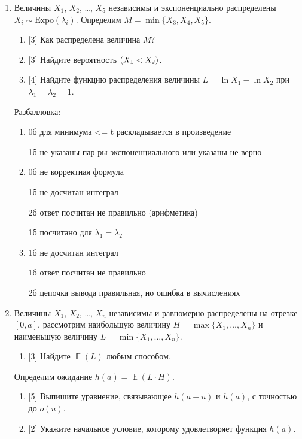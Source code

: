 \documentclass[12pt]{article}
\let\P\relax
\DeclareMathOperator{\P}{\mathbb{P}}
\DeclareMathOperator{\E}{\mathbb{E}}
\newcommand{\dExpo}{\mathrm{Expo}}
\begin{document}
\begin{enumerate}
    

    \item Величины $X_1$, $X_2$, \dots, $X_5$ независимы и экспоненциально распределены $X_i \sim \dExpo(\lambda_i)$.
    Определим  $M = \min\{X_3, X_4, X_5\}$.
    \begin{enumerate}
        \item {[3]} Как распределена величина $M$?
        \item {[3]} Найдите вероятность $\P(X_1 < X_2)$.
        \item {[4]} Найдите функцию распределения величины $L = \ln X_1 - \ln X_2$ при $\lambda_1 = \lambda_2 = 1$.
    \end{enumerate}


    Разбалловка:

    \begin{enumerate}
        \item 0б для минимума <= t раскладывается в произведение
        
        1б не указаны пар-ры экспоненциального или указаны не верно
        \item  0б не корректная формула
        
        1б не досчитан интеграл
        
        2б ответ посчитан не правильно (арифметика)
        
        1б посчитано для $\lambda_1 = \lambda_2$
        
        \item  1б не досчитан интеграл
        
        1б ответ посчитан не правильно
        
        2б цепочка вывода правильная, но ошибка в вычислениях
    \end{enumerate}


    \item Величины $X_1$, $X_2$, \dots, $X_n$ независимы и равномерно распределены на отрезке $[0, a]$,
    рассмотрим наибольшую величину $H = \max\{X_1, \dots, X_n\}$ и наименьшую величину $L = \min\{X_1, \dots, X_n\}$.
    \begin{enumerate}
        \item {[3]} Найдите $\E(L)$ любым способом. 
    \end{enumerate}
    Определим ожидание $h(a) = \E(L \cdot H)$.
    \begin{enumerate}[resume]
        \item {[5]} Выпишите уравнение, связывающее $h(a + u)$ и $h(a)$, с точностью до $o(u)$.
        \item {[2]} Укажите начальное условие, которому удовлетворяет функция $h(a)$.
    \end{enumerate}


\end{enumerate}
\end{document}
